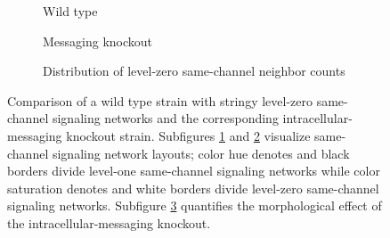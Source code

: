 \begin{figure}[!htbp]
\begin{center}

\hspace*{\fill}%
\begin{minipage}[t]{0.45\columnwidth}
\centering
\vspace{0pt} %
\begin{subfigure}[b]{\textwidth}
\caption{Wild type}
\label{fig:morphology-wt}
\end{subfigure}
\end{minipage}%
\hfill
\begin{minipage}[t]{0.45\columnwidth}
\centering
\vspace{0pt} %
\begin{subfigure}[b]{\textwidth}
%
\caption{Messaging knockout}
\label{fig:morphology-ko}
\end{subfigure}
\end{minipage}%
\hspace*{\fill}

\hspace*{\fill}%
\begin{minipage}[t]{\columnwidth}
\centering
\vspace{0pt} %
\begin{subfigure}[b]{\textwidth}
\caption{Distribution of level-zero same-channel neighbor counts}
\label{fig:morphology-shape}
\end{subfigure}
\end{minipage}%
\hspace*{\fill}

\caption{
Comparison of a wild type strain with stringy level-zero same-channel signaling networks and the corresponding intracellular-messaging knockout strain.
Subfigures \ref{fig:morphology-wt} and \ref{fig:morphology-ko} visualize same-channel signaling network layouts;
color hue denotes and black borders divide level-one same-channel signaling networks while
color saturation denotes and white borders divide level-zero same-channel signaling networks.
Subfigure \ref{fig:morphology-shape} quantifies the morphological effect of the intracellular-messaging knockout.
}
\label{fig:ko-morphology}
\end{center}
\end{figure}
